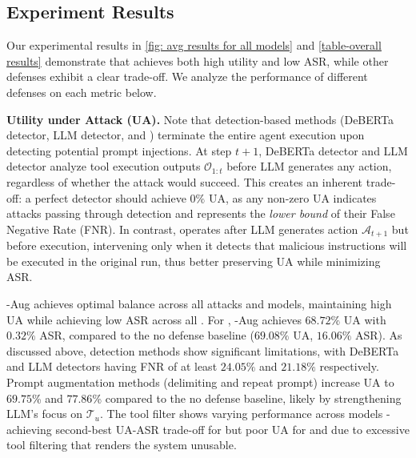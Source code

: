 \subsection{Experiment Results}
\label{subsec:sec4-results}



Our experimental results in \cref{fig: avg results for all models} and \cref{table-overall results} demonstrate that \method achieves both high utility and low ASR, while other defenses exhibit a clear trade-off. We analyze the performance of different defenses on each metric below.


\textbf{Utility under Attack (UA).}
Note that detection-based methods (DeBERTa detector, LLM detector, and \method) terminate the entire agent execution upon detecting potential prompt injections. At step $t+1$, DeBERTa detector and LLM detector analyze tool execution outputs $\mathcal{O}_{1:t}$ before LLM generates any action, regardless of whether the attack would succeed. This creates an inherent trade-off: a perfect detector should achieve $0\%$ UA, as any non-zero UA indicates attacks passing through detection and represents the \textit{lower bound} of their False Negative Rate (FNR). In contrast, \method operates after LLM generates action $\mathcal{A}_{t+1}$ but before execution, intervening only when it detects that malicious instructions will be executed in the original run, thus better preserving UA while minimizing ASR.

\method-Aug achieves optimal balance across all attacks and models, maintaining high UA while achieving low ASR across all \llm. For \gpt, \method-Aug achieves $68.72\%$ UA with $0.32\%$ ASR, compared to the no defense baseline ($69.08\%$ UA, $16.06\%$ ASR). As discussed above, detection methods show significant limitations, with DeBERTa and LLM detectors having FNR of at least $24.05\%$ and $21.18\%$ respectively. Prompt augmentation methods (delimiting and repeat prompt) increase UA to $69.75$\% and $77.86$\% compared to the no defense baseline, likely by strengthening LLM's focus on $\mathcal{T}_u$. The tool filter shows varying performance across models - achieving second-best UA-ASR trade-off for \gpt but poor UA for \othree and \llama due to excessive tool filtering that renders the system unusable.



